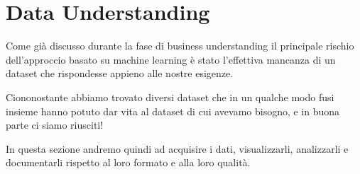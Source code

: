 \documentclass[a4paper, 11pt, oneside]{report}
\begin{document}
            \newpage
            \section{Data Understanding}
            Come già discusso durante la fase di business understanding il principale rischio dell'approccio basato su machine
            learning è stato l'effettiva mancanza di un dataset che rispondesse appieno alle nostre esigenze.
            \par \noindent Ciononostante abbiamo trovato diversi dataset che in un qualche modo fusi insieme hanno potuto
            dar vita al dataset di cui avevamo bisogno, e in buona parte ci siamo riusciti!
            \par \noindent In questa sezione andremo quindi ad acquisire i dati, visualizzarli, analizzarli e documentarli rispetto al loro
            formato e alla loro qualità.
\end{document}

